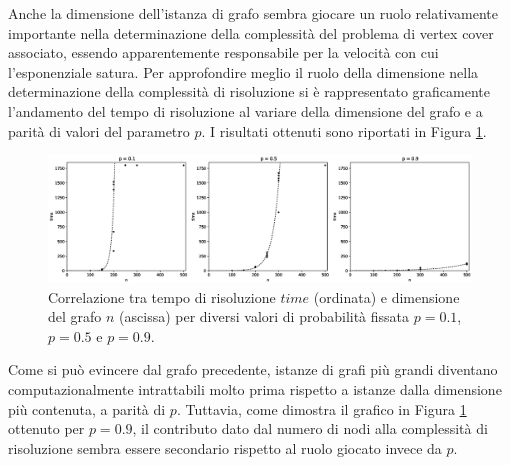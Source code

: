 Anche la dimensione dell'istanza di grafo sembra giocare un ruolo relativamente importante nella determinazione della complessità del problema di vertex cover associato, essendo apparentemente responsabile per la velocità con cui l'esponenziale satura.
Per approfondire meglio il ruolo della dimensione nella determinazione della complessità di risoluzione si è rappresentato graficamente l'andamento del tempo di risoluzione al variare della dimensione del grafo e a parità di valori del parametro $p$. I risultati ottenuti sono riportati in Figura \ref{fig:gnpp}.

\begin{figure}[h!]
     \centering
       \includegraphics[scale=0.4]{images/gnp_p.eps}
       \caption{Correlazione tra tempo di risoluzione $time$ (ordinata) e dimensione del grafo $n$ (ascissa) per diversi valori di probabilità fissata $p=0.1$, $p=0.5$ e $p=0.9$.}
        \label{fig:gnpp}
\end{figure}

Come si può evincere dal grafo precedente, istanze di grafi più grandi diventano computazionalmente intrattabili molto prima rispetto a istanze dalla dimensione più contenuta, a parità di $p$. Tuttavia, come dimostra il grafico in Figura \ref{fig:gnpp} ottenuto per $p=0.9$,  il contributo dato dal numero di nodi alla complessità di risoluzione sembra essere secondario rispetto al ruolo giocato invece da $p$. 

